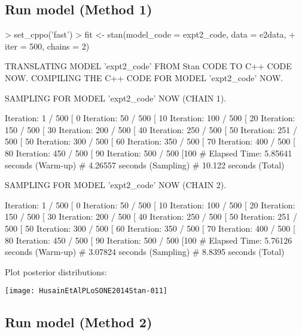 \documentclass{article}
\begin{document}
\subsection{Run model (Method 1)}

\begin{Schunk}
\begin{Sinput}
> set_cppo('fast')
> fit <- stan(model_code = expt2_code, data = e2data, 
+             iter = 500, chains = 2)
\end{Sinput}
\begin{Soutput}
TRANSLATING MODEL 'expt2_code' FROM Stan CODE TO C++ CODE NOW.
COMPILING THE C++ CODE FOR MODEL 'expt2_code' NOW.

SAMPLING FOR MODEL 'expt2_code' NOW (CHAIN 1).

Iteration:   1 / 500 [  0%]  (Warmup)
Iteration:  50 / 500 [ 10%]  (Warmup)
Iteration: 100 / 500 [ 20%]  (Warmup)
Iteration: 150 / 500 [ 30%]  (Warmup)
Iteration: 200 / 500 [ 40%]  (Warmup)
Iteration: 250 / 500 [ 50%]  (Warmup)
Iteration: 251 / 500 [ 50%]  (Sampling)
Iteration: 300 / 500 [ 60%]  (Sampling)
Iteration: 350 / 500 [ 70%]  (Sampling)
Iteration: 400 / 500 [ 80%]  (Sampling)
Iteration: 450 / 500 [ 90%]  (Sampling)
Iteration: 500 / 500 [100%]  (Sampling)
#  Elapsed Time: 5.85641 seconds (Warm-up)
#                4.26557 seconds (Sampling)
#                10.122 seconds (Total)


SAMPLING FOR MODEL 'expt2_code' NOW (CHAIN 2).

Iteration:   1 / 500 [  0%]  (Warmup)
Iteration:  50 / 500 [ 10%]  (Warmup)
Iteration: 100 / 500 [ 20%]  (Warmup)
Iteration: 150 / 500 [ 30%]  (Warmup)
Iteration: 200 / 500 [ 40%]  (Warmup)
Iteration: 250 / 500 [ 50%]  (Warmup)
Iteration: 251 / 500 [ 50%]  (Sampling)
Iteration: 300 / 500 [ 60%]  (Sampling)
Iteration: 350 / 500 [ 70%]  (Sampling)
Iteration: 400 / 500 [ 80%]  (Sampling)
Iteration: 450 / 500 [ 90%]  (Sampling)
Iteration: 500 / 500 [100%]  (Sampling)
#  Elapsed Time: 5.76126 seconds (Warm-up)
#                3.07824 seconds (Sampling)
#                8.8395 seconds (Total)
\end{Soutput}
\end{Schunk}

Plot posterior distributions:

\texttt{[image: HusainEtAlPLoSONE2014Stan-011]}


\subsection{Run model (Method 2)}
\end{document}
